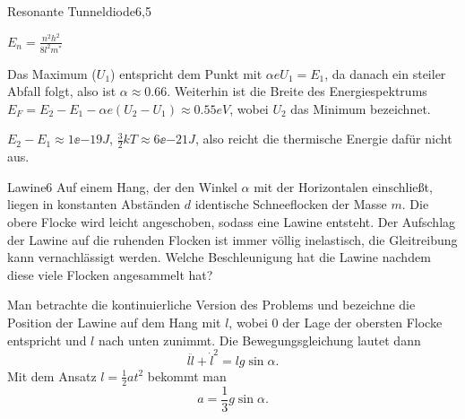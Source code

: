 \begin{problem}{Resonante Tunneldiode}{6,5}
\begin{solution}
\begin{abcenum}
\item $E_n = \frac{n^2 h^2}{8 l^2 m^*}$
\item Das Maximum ($U_1$) entspricht dem Punkt mit $\alpha e U_1 = E_1$, da danach ein steiler Abfall folgt, also ist $\alpha \approx 0.66$. Weiterhin ist die Breite des Energiespektrums $E_F = E_2 - E_1 - \alpha e (U_2 - U_1) \approx 0.55 \unit{eV}$, wobei $U_2$ das Minimum bezeichnet.
\item $E_2 - E_1 \approx 1\ee{-19}\unit{J}$, $\frac32 kT \approx 6\ee{-21}\unit{J}$, also reicht die thermische Energie dafür nicht aus.
\end{abcenum}
\end{solution}
\end{problem}


\begin{problem}{Lawine}{6}
Auf einem Hang, der den Winkel $\alpha$ mit der Horizontalen einschließt, liegen in konstanten Abständen $d$ identische Schneeflocken der Masse $m$. Die obere Flocke wird leicht angeschoben, sodass eine Lawine entsteht. Der Aufschlag der Lawine auf die ruhenden Flocken ist immer völlig inelastisch, die Gleitreibung kann vernachlässigt werden. Welche Beschleunigung hat die Lawine nachdem diese viele Flocken angesammelt hat?
\begin{solution}
Man betrachte die kontinuierliche Version des Problems und bezeichne die Position der Lawine auf dem Hang mit $l$, wobei $0$ der Lage der obersten Flocke entspricht und $l$ nach unten zunimmt. Die Bewegungsgleichung lautet dann
\[
l \ddot l + \dot l^2 = l g \sin\alpha.
\]
Mit dem Ansatz $l = \frac12 a t^2$ bekommt man
\[
a = \frac13 g \sin\alpha.
\]
\end{solution}
\end{problem}


